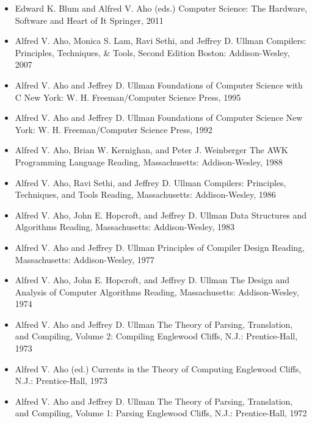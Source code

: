 \documentclass[a4paper]{article}
\begin{document}
\begin{itemize}
    \item Edward K. Blum and Alfred V. Aho (eds.)
    Computer Science: The Hardware, Software and Heart of It
    Springer, 2011 
    
    \item Alfred V. Aho, Monica S. Lam, Ravi Sethi, and Jeffrey D. Ullman
    Compilers: Principles, Techniques, & Tools, Second Edition
    Boston: Addison-Wesley, 2007 
    
    \item Alfred V. Aho and Jeffrey D. Ullman
    Foundations of Computer Science with C
    New York: W. H. Freeman/Computer Science Press, 1995
    
    \item Alfred V. Aho and Jeffrey D. Ullman
    Foundations of Computer Science
    New York: W. H. Freeman/Computer Science Press, 1992 
    
    \item Alfred V. Aho, Brian W. Kernighan, and Peter J. Weinberger
    The AWK Programming Language
    Reading, Massachusetts: Addison-Wesley, 1988 
    
    \item Alfred V. Aho, Ravi Sethi, and Jeffrey D. Ullman
    Compilers: Principles, Techniques, and Tools
    Reading, Massachusetts: Addison-Wesley, 1986

    \item Alfred V. Aho, John E. Hopcroft, and Jeffrey D. Ullman
    Data Structures and Algorithms
    Reading, Massachusetts: Addison-Wesley, 1983

    \item Alfred V. Aho and Jeffrey D. Ullman
    Principles of Compiler Design
    Reading, Massachusetts: Addison-Wesley, 1977
    
    \item Alfred V. Aho, John E. Hopcroft, and Jeffrey D. Ullman
    The Design and Analysis of Computer Algorithms
    Reading, Massachusetts: Addison-Wesley, 1974

    \item Alfred V. Aho and Jeffrey D. Ullman
    The Theory of Parsing, Translation, and Compiling, Volume 2: Compiling
    Englewood Cliffs, N.J.: Prentice-Hall, 1973

    \item Alfred V. Aho (ed.)
    Currents in the Theory of Computing
    Englewood Cliffs, N.J.: Prentice-Hall, 1973

    \item Alfred V. Aho and Jeffrey D. Ullman
    The Theory of Parsing, Translation, and Compiling, Volume 1: Parsing
    Englewood Cliffs, N.J.: Prentice-Hall, 1972



    
\end{itemize}
\end{document}
